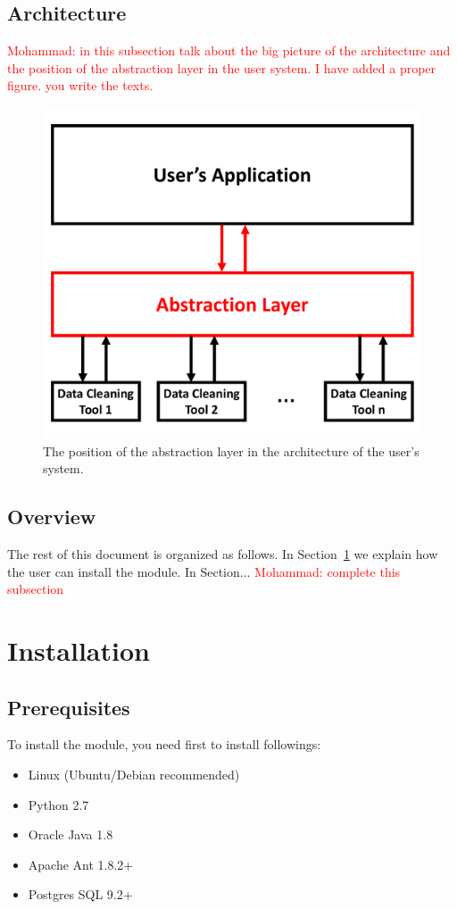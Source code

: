 \documentclass[12pt]{article}
\newcommand{\mohammad}[1]{\textcolor{red}{Mohammad: #1}}
\begin{document}
\subsection{Architecture}
\mohammad{in this subsection talk about the big picture of the architecture and the position of the abstraction layer in the user system. I have added a proper figure. you write the texts.}
\begin{figure}[t]
	\centering
	\includegraphics[scale=0.3]{attachments/architecture}
	\caption{The position of the abstraction layer in the architecture of the user's system.}
	\label{figure:architecture}
\end{figure}

\subsection{Overview}
The rest of this document is organized as follows. In Section~\ref{section:installation} we explain how the user can install the module. In Section...
\mohammad{complete this subsection}


\section{Installation}
\label{section:installation}

\subsection{Prerequisites}
To install the module, you need first to install followings:
\begin{itemize}
	\item Linux (Ubuntu/Debian recommended)
	\item Python 2.7
	\item Oracle Java 1.8
	\item Apache Ant 1.8.2+
	\item Postgres SQL 9.2+
\end{itemize}
\end{document}
